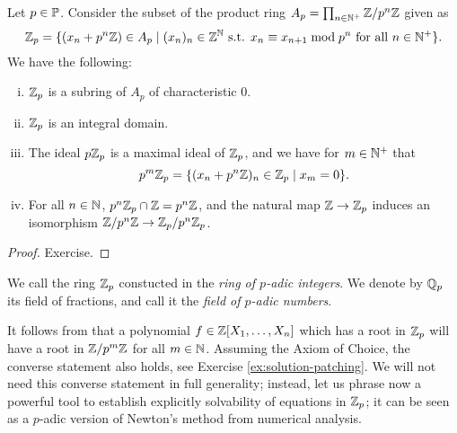 \documentclass[12pt, leqno, british]{amsart}
\begin{document}
\begin{prop}\label{P:Zp-construction}
Let $p \in \mathbb P$. Consider the subset of the product ring $A_p = \prod_{n \in \mathbb N^+} \mathbb Z/p^n \mathbb Z$ given as
$$ \mathbb Z_p = \lbrace (x_n + p^n\mathbb Z) \in A_p \mid (x_n)_n \in \mathbb Z^\mathbb N \text{ s.t. } x_n \equiv x_{n+1} \bmod p^n \text{ for all } n \in \mathbb N^+ \rbrace.$$
We have the following:
\begin{enumerate}[(i)]
\item $\mathbb Z_p$ is a subring of $A_p$ of characteristic $0$.
\item $\mathbb Z_p$ is an integral domain.
\item The ideal $p\mathbb Z_p$ is a maximal ideal of $\mathbb Z_p$, and we have for $m \in \mathbb N^+$ that
$$ p^m\mathbb Z_p = \lbrace (x_n + p^n\mathbb Z)_n \in \mathbb Z_p \mid x_m = 0 \rbrace.$$
\item For all $n \in \mathbb N$, $p^n\mathbb Z_p \cap \mathbb Z = p^n\mathbb Z$, and the natural map $\mathbb Z \to \mathbb Z_p$ induces an isomorphism $\mathbb Z/p^n\mathbb Z \to \mathbb Z_p/p^n\mathbb Z_p$.
\end{enumerate}
\end{prop}
\begin{proof}
Exercise.
\end{proof}
\begin{defi}
We call the ring $\mathbb Z_p$ constucted in  the \emph{ring of $p$-adic integers}.
We denote by $\mathbb Q_p$ its field of fractions, and call it the \emph{field of $p$-adic numbers}.
\end{defi}
It follows from  that a polynomial $f \in \mathbb Z[X_1, \ldots, X_n]$ which has a root in $\mathbb Z_p$ will have a root in $\mathbb Z/p^m\mathbb Z$ for all $m \in \mathbb N$.
Assuming the Axiom of Choice, the converse statement also holds, see Exercise \eqref{ex:solution-patching}.
We will not need this converse statement in full generality;
instead, let us phrase now a powerful tool to establish explicitly solvability of equations in $\mathbb Z_p$; it can be seen as a $p$-adic version of Newton's method from numerical analysis.
\end{document}
